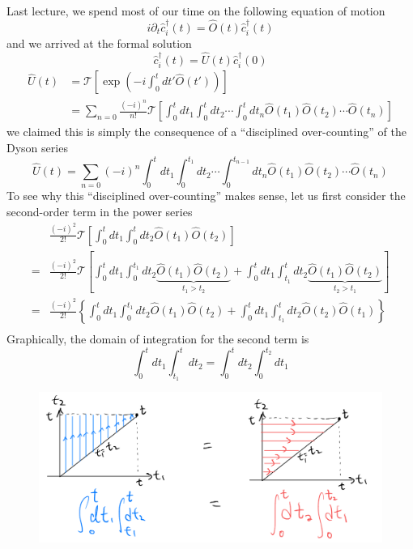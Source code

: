Last lecture, we spend most of our time on the following equation of motion
\[ i\partial _t\hat{c}_{i}^{\dagger}\left( t \right) =\hat{O}\left( t \right) \hat{c}_{i}^{\dagger}\left( t \right) \]
and we arrived at the formal solution
\[ \hat{c}_{i}^{\dagger}\left( t \right) =\hat{U}\left( t \right) \hat{c}_{i}^{\dagger}\left( 0 \right) \]
\begin{align*}
    \hat{U}\left( t \right) &=\mathcal{T} \left[ \exp \left( -i\int_0^t{dt'\hat{O}\left( t' \right)} \right) \right] \\
    &=\sum_{n=0}{\frac{\left( -i \right) ^n}{n!}\mathcal{T} \left[ \int_0^t{dt_1\int_0^t{dt_2\cdots \int_0^t{dt_n\hat{O}\left( t_1 \right) \hat{O}\left( t_2 \right) \cdots \hat{O}\left( t_n \right)}}} \right]}
\end{align*}
we claimed this is simply the consequence of a ``disciplined over-counting'' of the Dyson series
\[ \hat{U}\left( t \right) =\sum_{n=0}{\left( -i \right) ^n\int_0^t{dt_1\int_0^{t_1}{dt_2\cdots \int_0^{t_{n-1}}{dt_n\hat{O}\left( t_1 \right) \hat{O}\left( t_2 \right) \cdots \hat{O}\left( t_n \right)}}}}\]
To see why this ``disciplined over-counting'' makes sense, let us first consider the second-order term in the power series
\begin{align*}
    &\frac{\left( -i \right) ^2}{2!}\mathcal{T} \left[ \int_0^t{dt_1\int_0^t{dt_2\hat{O}\left( t_1 \right) \hat{O}\left( t_2 \right)}} \right] \\
    =&\frac{\left( -i \right) ^2}{2!}\mathcal{T} \left[ \int_0^t{dt_1\int_0^{t_1}{dt_2\underset{t_1>t_2}{\underbrace{\hat{O}\left( t_1 \right) \hat{O}\left( t_2 \right) }}}}+\int_0^t{dt_1\int_{t_1}^t{dt_2\underset{t_2>t_1}{\underbrace{\hat{O}\left( t_1 \right) \hat{O}\left( t_2 \right) }}}} \right] \\
    =&\frac{\left( -i \right) ^2}{2!}\left\{ \int_0^t{dt_1\int_0^{t_1}{dt_2\hat{O}\left( t_1 \right) \hat{O}\left( t_2 \right)}}+\int_0^t{dt_1\int_{t_1}^t{dt_2\hat{O}\left( t_2 \right) \hat{O}\left( t_1 \right)}} \right\} \\
\end{align*}
Graphically, the domain of integration for the second term is
\[ \int_0^t{dt_1\int_{t_1}^t{dt_2}}=\int_0^t{dt_2\int_0^{t_2}{dt_1}}\]

\begin{figure}[ht]
    \centering
    \includegraphics[width=\textwidth]{jupyterbook/data/fig/lec09-fig00.png}
\end{figure}

